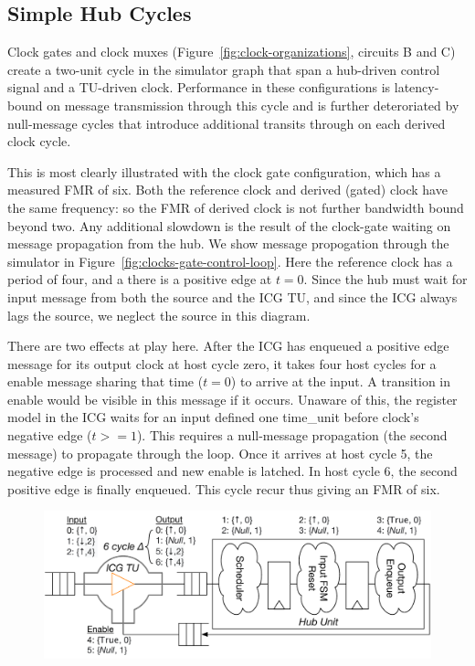 \subsection{Simple Hub Cycles}
Clock gates and clock muxes (Figure~\ref{fig:clock-organizations}, circuits B and C) create a
two-unit cycle in the simulator graph that span a hub-driven control signal and a
TU-driven clock. Performance in these configurations is latency-bound on
message transmission through this cycle and is further deteroriated by
null-message cycles that introduce additional transits through on each derived
clock cycle.

This is most clearly illustrated with the clock gate configuration, which has a
measured FMR of six. Both the reference clock and derived (gated) clock have
the same frequency: so the FMR of derived clock is not further bandwidth bound
beyond two. Any additional slowdown is the result of the clock-gate waiting on
message propagation from the hub. We show message propogation through the
simulator in Figure~\ref{fig:clocks-gate-control-loop}. Here the reference clock has a period of
four, and a there is a positive edge at $t = 0$. Since the hub must wait for
input message from both the source and the ICG TU, and since the ICG always
lags the source, we neglect the source in this diagram.

There are two effects at play here. After the ICG has enqueued a positive edge
message for its output clock at host cycle zero,  it takes four host cycles for
a enable message sharing that time ($t=0$) to arrive at the input. A transition
in enable would be visible in this message if it occurs. Unaware of this, the
register model in the ICG waits for an input defined one time\_unit before
clock's negative edge ($t >= 1$). This requires a null-message propagation (the
second message) to propagate through the loop. Once it arrives at host cycle 5,
the negative edge is processed and new enable is latched. In host cycle 6, the
second positive edge is finally enqueued. This cycle recur thus giving an FMR
of six.

\begin{figure}
    \centering
    \captionsetup{margin=0.25cm}
    \includegraphics[width=\columnwidth]{figures/clock-gate-control-loop.pdf}
    \caption{}
    \label{fig:clock-gate-control-loop}
\end{figure}


